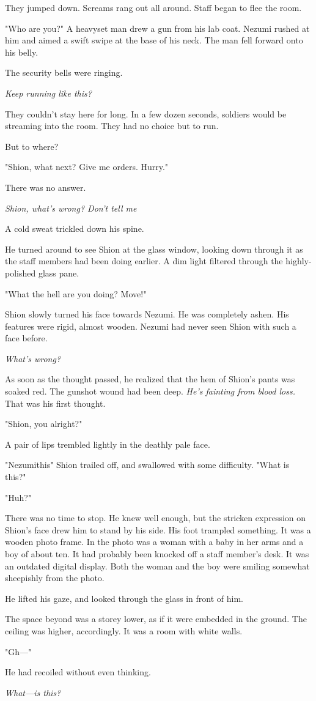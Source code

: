 They jumped down. Screams rang out all around. Staff began to flee the
room.

"Who are you?" A heavyset man drew a gun from his lab coat. Nezumi
rushed at him and aimed a swift swipe at the base of his neck. The man
fell forward onto his belly.

The security bells were ringing.

\emph{Keep running like this?}

They couldn't stay here for long. In a few dozen seconds, soldiers would
be streaming into the room. They had no choice but to run.

But to where?

"Shion, what next? Give me orders. Hurry."

There was no answer.

\emph{Shion, what's wrong? Don't tell me\el }

A cold sweat trickled down his spine.

He turned around to see Shion at the glass window, looking
down through it as the staff members had been doing earlier. A dim light
filtered through the highly-polished glass pane.

"What the hell are you doing? Move!"

Shion slowly turned his face towards Nezumi. He was completely ashen.
His features were rigid, almost wooden. Nezumi had never seen Shion with
such a face before.

\emph{What's wrong?}

As soon as the thought passed, he realized that the hem of Shion's pants
was soaked red. The gunshot wound had been deep. \emph{He's fainting from
blood loss.} That was his first thought.

"Shion, you alright?"

A pair of lips trembled lightly in the deathly pale face.

"Nezumi\el this\el " Shion trailed off, and swallowed with some
difficulty. "What is this\el ?"

"Huh?"

There was no time to stop. He knew well enough, but the stricken
expression on Shion's face drew him to stand by his side. His foot
trampled something. It was a wooden photo frame. In the photo was a
woman with a baby in her arms and a boy of about ten. It had probably
been knocked off a staff member's desk. It was an outdated digital
display. Both the woman and the boy were smiling somewhat sheepishly
from the photo.

He lifted his gaze, and looked through the glass in front of him.

The space beyond was a storey lower, as if it were embedded in the
ground. The ceiling was higher, accordingly. It was a room with white
walls.

"Gh---"

He had recoiled without even thinking.

\emph{What---is this?}